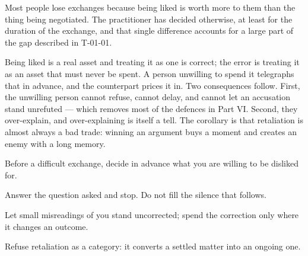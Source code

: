 


\begin{core}
Most people lose exchanges because being liked is worth more to them than the thing being negotiated. The practitioner has decided otherwise, at least for the duration of the exchange, and that single difference accounts for a large part of the gap described in T-01-01.
\end{core}

\begin{mechanism}
Being liked is a real asset and treating it as one is correct; the error is treating it as an asset that must never be spent. A person unwilling to spend it telegraphs that in advance, and the counterpart prices it in. Two consequences follow. First, the unwilling person cannot refuse, cannot delay, and cannot let an accusation stand unrefuted --- which removes most of the defences in Part VI. Second, they over-explain, and over-explaining is itself a tell. The corollary is that retaliation is almost always a bad trade: winning an argument buys a moment and creates an enemy with a long memory.
\end{mechanism}

\begin{application}
  \item Before a difficult exchange, decide in advance what you are willing to be disliked for.
  \item Answer the question asked and stop. Do not fill the silence that follows.
  \item Let small misreadings of you stand uncorrected; spend the correction only where it changes an outcome.
  \item Refuse retaliation as a category: it converts a settled matter into an ongoing one.
\end{application}

